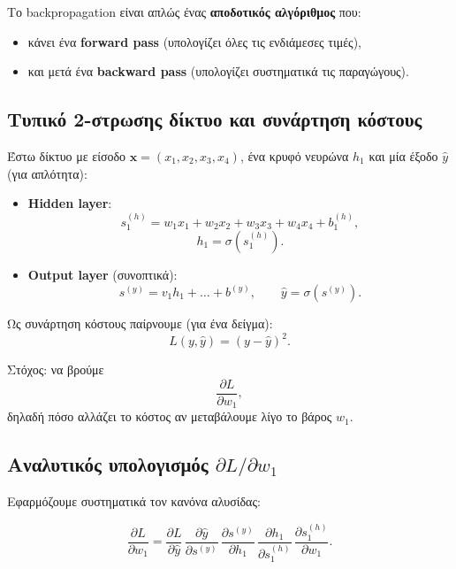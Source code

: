 \documentclass[a4paper,11pt]{article}
\begin{document}
Το backpropagation είναι απλώς ένας \textbf{αποδοτικός αλγόριθμος}
που:
\begin{itemize}
  \item κάνει ένα \textbf{forward pass} (υπολογίζει όλες τις ενδιάμεσες τιμές),
  \item και μετά ένα \textbf{backward pass} (υπολογίζει συστηματικά τις παραγώγους).
\end{itemize}

\subsection{Τυπικό 2-στρωσης δίκτυο και συνάρτηση κόστους}

Έστω δίκτυο με είσοδο $\mathbf{x}=(x_1,x_2,x_3,x_4)$, ένα κρυφό νευρώνα $h_1$
και μία έξοδο $\hat{y}$ (για απλότητα):

\begin{itemize}
  \item \textbf{Hidden layer}:
        \[
        s^{(h)}_1 = w_1 x_1 + w_2 x_2 + w_3 x_3 + w_4 x_4 + b^{(h)}_1,
        \]
        \[
        h_1 = \sigma(s^{(h)}_1).
        \]
  \item \textbf{Output layer} (συνοπτικά):
        \[
        s^{(y)} = v_1 h_1 + \dots + b^{(y)}, \qquad
        \hat{y} = \sigma(s^{(y)}).
        \]
\end{itemize}

Ως συνάρτηση κόστους παίρνουμε (για ένα δείγμα):
\[
L(y,\hat{y}) = (y - \hat{y})^2.
\]

Στόχος: να βρούμε
\[
\frac{\partial L}{\partial w_1},
\]
δηλαδή πόσο αλλάζει το κόστος αν μεταβάλουμε λίγο το βάρος $w_1$.

\subsection{Αναλυτικός υπολογισμός $\partial L / \partial w_1$}

Εφαρμόζουμε συστηματικά τον κανόνα αλυσίδας:

\[
\frac{\partial L}{\partial w_1}
= \frac{\partial L}{\partial \hat{y}}\,
  \frac{\partial \hat{y}}{\partial s^{(y)}}\,
  \frac{\partial s^{(y)}}{\partial h_1}\,
  \frac{\partial h_1}{\partial s^{(h)}_1}\,
  \frac{\partial s^{(h)}_1}{\partial w_1}.
\]
\end{document}
